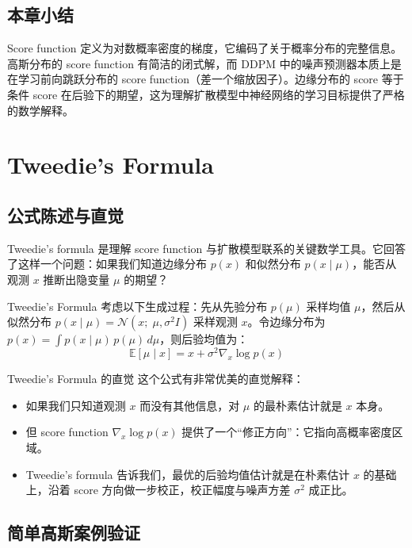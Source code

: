 \documentclass[a4paper]{article}
\begin{document}
\subsection{本章小结}

Score function 定义为对数概率密度的梯度，它编码了关于概率分布的完整信息。高斯分布的 score function 有简洁的闭式解，而 DDPM 中的噪声预测器本质上是在学习前向跳跃分布的 score function（差一个缩放因子）。边缘分布的 score 等于条件 score 在后验下的期望，这为理解扩散模型中神经网络的学习目标提供了严格的数学解释。

\section{Tweedie's Formula}

\subsection{公式陈述与直觉}

Tweedie's formula 是理解 score function 与扩散模型联系的关键数学工具。它回答了这样一个问题：如果我们知道边缘分布 $p(x)$ 和似然分布 $p(x \mid \mu)$，能否从观测 $x$ 推断出隐变量 $\mu$ 的期望？

\begin{importantbox}{Tweedie's Formula}
考虑以下生成过程：先从先验分布 $p(\mu)$ 采样均值 $\mu$，然后从似然分布 $p(x \mid \mu) = \mathcal{N}(x;\; \mu, \sigma^2 I)$ 采样观测 $x$。令边缘分布为 $p(x) = \int p(x \mid \mu)\, p(\mu)\, d\mu$，则后验均值为：
$$\mathbb{E}[\mu \mid x] = x + \sigma^2 \nabla_x \log p(x)$$
\end{importantbox}

\begin{knowledgebox}{Tweedie's Formula 的直觉}
这个公式有非常优美的直觉解释：
\begin{itemize}
    \item 如果我们只知道观测 $x$ 而没有其他信息，对 $\mu$ 的最朴素估计就是 $x$ 本身。
    \item 但 score function $\nabla_x \log p(x)$ 提供了一个``修正方向''：它指向高概率密度区域。
    \item Tweedie's formula 告诉我们，最优的后验均值估计就是在朴素估计 $x$ 的基础上，沿着 score 方向做一步校正，校正幅度与噪声方差 $\sigma^2$ 成正比。
\end{itemize}
\end{knowledgebox}

\subsection{简单高斯案例验证}
\end{document}
